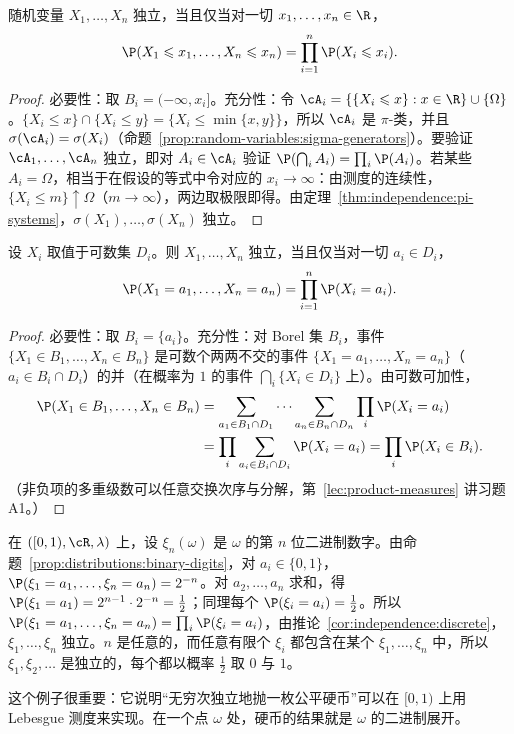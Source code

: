 \begin{corollary}[用分布函数判别独立性]\label{cor:independence:df}
随机变量 $X_1,\dots,X_n$ 独立，当且仅当对一切 $x_1,\dots,x_n\in\R$，
\[
\P(X_1\leqslant x_1,\dots,X_n\leqslant x_n)=\prod_{i=1}^n\P(X_i\leqslant x_i).
\]
\end{corollary}
\begin{proof}
必要性：取 $B_i=(-\infty,x_i]$。充分性：令 $\cA_i=\{\{X_i\leqslant x\}:x\in\R\}\cup\{\Omega\}$。$\{X_i\leqslant x\}\cap\{X_i\leqslant y\}=\{X_i\leqslant\min\{x,y\}\}$，所以 $\cA_i$ 是 $\pi$-类，并且 $\sigma(\cA_i)=\sigma(X_i)$（命题~\ref{prop:random-variables:sigma-generators}）。要验证 $\cA_1,\dots,\cA_n$ 独立，即对 $A_i\in\cA_i$ 验证 $\P(\bigcap_iA_i)=\prod_i\P(A_i)$。若某些 $A_i=\Omega$，相当于在假设的等式中令对应的 $x_i\to\infty$：由测度的连续性，$\{X_i\leqslant m\}\uparrow\Omega$（$m\to\infty$），两边取极限即得。由定理~\ref{thm:independence:pi-systems}，$\sigma(X_1),\dots,\sigma(X_n)$ 独立。
\end{proof}

\begin{corollary}[离散型随机变量的独立性]\label{cor:independence:discrete}
设 $X_i$ 取值于可数集 $D_i$。则 $X_1,\dots,X_n$ 独立，当且仅当对一切 $a_i\in D_i$，
\[
\P(X_1=a_1,\dots,X_n=a_n)=\prod_{i=1}^n\P(X_i=a_i).
\]
\end{corollary}
\begin{proof}
必要性：取 $B_i=\{a_i\}$。充分性：对 Borel 集 $B_i$，事件 $\{X_1\in B_1,\dots,X_n\in B_n\}$ 是可数个两两不交的事件 $\{X_1=a_1,\dots,X_n=a_n\}$（$a_i\in B_i\cap D_i$）的并（在概率为 $1$ 的事件 $\bigcap_i\{X_i\in D_i\}$ 上）。由可数可加性，
\[
\begin{aligned}
\P(X_1\in B_1,\dots,X_n\in B_n)&=\sum_{a_1\in B_1\cap D_1}\cdots\sum_{a_n\in B_n\cap D_n}\prod_i\P(X_i=a_i)\\
&=\prod_i\sum_{a_i\in B_i\cap D_i}\P(X_i=a_i)=\prod_i\P(X_i\in B_i).
\end{aligned}
\]
（非负项的多重级数可以任意交换次序与分解，第~\ref{lec:product-measures} 讲习题 A1。）
\end{proof}

\begin{example}[二进制数字是独立的公平硬币]\label{ex:independence:binary-digits}
在 $([0,1),\cR,\lambda)$ 上，设 $\xi_n(\omega)$ 是 $\omega$ 的第 $n$ 位二进制数字。由命题~\ref{prop:distributions:binary-digits}，对 $a_i\in\{0,1\}$，$\P(\xi_1=a_1,\dots,\xi_n=a_n)=2^{-n}$。对 $a_2,\dots,a_n$ 求和，得 $\P(\xi_1=a_1)=2^{n-1}\cdot2^{-n}=\frac12$；同理每个 $\P(\xi_i=a_i)=\frac12$。所以 $\P(\xi_1=a_1,\dots,\xi_n=a_n)=\prod_i\P(\xi_i=a_i)$，由推论~\ref{cor:independence:discrete}，$\xi_1,\dots,\xi_n$ 独立。$n$ 是任意的，而任意有限个 $\xi_i$ 都包含在某个 $\xi_1,\dots,\xi_n$ 中，所以 $\xi_1,\xi_2,\dots$ 是独立的，每个都以概率 $\frac12$ 取 $0$ 与 $1$。

这个例子很重要：它说明“无穷次独立地抛一枚公平硬币”可以在 $[0,1)$ 上用 Lebesgue 测度来实现。在一个点 $\omega$ 处，硬币的结果就是 $\omega$ 的二进制展开。
\end{example}

